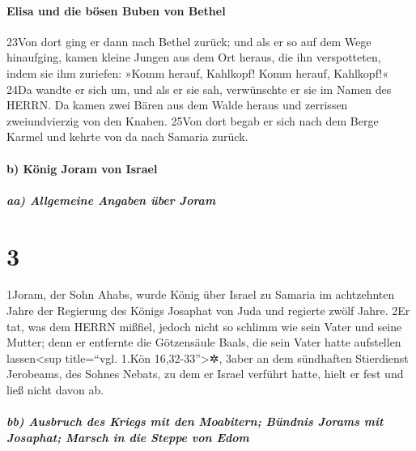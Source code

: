 \hypertarget{elisa-und-die-buxf6sen-buben-von-bethel}{%
\paragraph{Elisa und die bösen Buben von
Bethel}\label{elisa-und-die-buxf6sen-buben-von-bethel}}

23Von dort ging er dann nach Bethel zurück; und als er so auf dem Wege
hinaufging, kamen kleine Jungen aus dem Ort heraus, die ihn
verspotteten, indem sie ihm zuriefen: »Komm herauf, Kahlkopf! Komm
herauf, Kahlkopf!« 24Da wandte er sich um, und als er sie sah,
verwünschte er sie im Namen des HERRN. Da kamen zwei Bären aus dem Walde
heraus und zerrissen zweiundvierzig von den Knaben. 25Von dort begab er
sich nach dem Berge Karmel und kehrte von da nach Samaria zurück.

\hypertarget{b-kuxf6nig-joram-von-israel}{%
\paragraph{b) König Joram von
Israel}\label{b-kuxf6nig-joram-von-israel}}

\hypertarget{aa-allgemeine-angaben-uxfcber-joram}{%
\subparagraph{aa) Allgemeine Angaben über
Joram}\label{aa-allgemeine-angaben-uxfcber-joram}}

\hypertarget{section-2}{%
\section{3}\label{section-2}}

1Joram, der Sohn Ahabs, wurde König über Israel zu Samaria im
achtzehnten Jahre der Regierung des Königs Josaphat von Juda und
regierte zwölf Jahre. 2Er tat, was dem HERRN mißfiel, jedoch nicht so
schlimm wie sein Vater und seine Mutter; denn er entfernte die
Götzensäule Baals, die sein Vater hatte aufstellen lassen\textless sup
title=``vgl. 1.Kön 16,32-33''\textgreater✲, 3aber an dem sündhaften
Stierdienst Jerobeams, des Sohnes Nebats, zu dem er Israel verführt
hatte, hielt er fest und ließ nicht davon ab.

\hypertarget{bb-ausbruch-des-kriegs-mit-den-moabitern-buxfcndnis-jorams-mit-josaphat-marsch-in-die-steppe-von-edom}{%
\subparagraph{bb) Ausbruch des Kriegs mit den Moabitern; Bündnis Jorams
mit Josaphat; Marsch in die Steppe von
Edom}\label{bb-ausbruch-des-kriegs-mit-den-moabitern-buxfcndnis-jorams-mit-josaphat-marsch-in-die-steppe-von-edom}}


